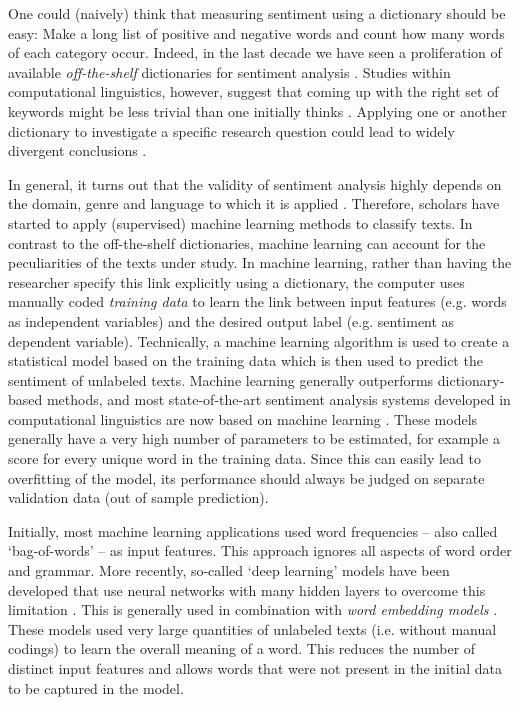 One could (naively) think that measuring sentiment using a dictionary should be easy:
Make a long list of positive and negative words and count how many words of each category occur.
Indeed, in the last decade we have seen a proliferation of available \emph{off-the-shelf} dictionaries for sentiment analysis \citep{gonzalez15, soroka15}.
Studies within computational linguistics, however, suggest that coming up with the right set of keywords might be less trivial than one initially thinks \citep[for an overview, see][]{pang08}. 
Applying one or another dictionary to investigate a specific research question could lead to widely divergent conclusions \citep{boukes2019,young12,gonzalez15,soroka15}.

In general, it turns out that the validity of sentiment analysis highly depends on the domain, genre and language to which it is applied \citep{gonzalez15,soroka15,pang08,thelwall2012sentiment}.
Therefore, scholars have started to apply (supervised) machine learning methods to classify texts. %
In contrast to the off-the-shelf dictionaries, machine learning can account for the peculiarities of the texts under study.
In machine learning, rather than having the researcher specify this link explicitly using a dictionary,
the computer uses manually coded \emph{training data} to learn the link between input features (e.g. words as independent variables) and the desired output label (e.g. sentiment as dependent variable).
Technically, a machine learning algorithm is used to create a statistical model based on the training data which is then used to 
predict the sentiment of unlabeled texts.
Machine learning generally outperforms dictionary-based methods, and most state-of-the-art sentiment analysis systems developed in computational linguistics are now based on machine learning \citep{semeval}. 
These models generally have a very high number of parameters to be estimated, for example a score for every unique word in the training data.
Since this can easily lead to overfitting of the model, 
its performance should always be judged on separate validation data (out of sample prediction).

Initially, most machine learning applications used word frequencies -- also called `bag-of-words' -- as input features.
This approach ignores all aspects of word order and grammar. 
More recently, so-called `deep learning' models have been developed that use neural networks with many hidden layers to overcome this limitation \citep{goldberg17}. 
This is generally used in combination with \emph{word embedding models} \citep{mikolov13distributed, rudkowsky2018more}. 
These models used very large quantities of unlabeled texts (i.e. without manual codings) 
to learn the overall meaning of a word.
This reduces the number of distinct input features and allows words that were not present in the initial data to be captured in the model. 

